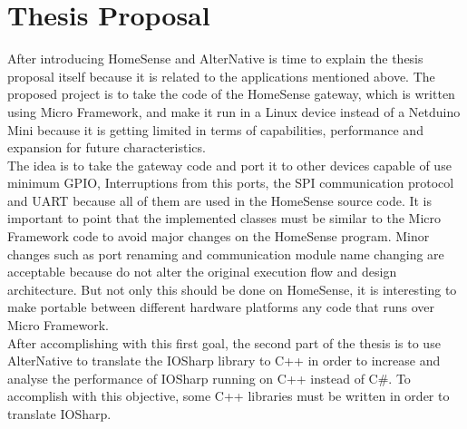 \section{Thesis Proposal}\label{S:Proposal-Thesis-Proposal}
After introducing HomeSense and AlterNative is time to explain the thesis proposal itself because it is related to the applications mentioned above. The proposed project is to take the code of the HomeSense gateway, which is written using Micro Framework, and make it run in a Linux device instead of a Netduino Mini because it is getting limited in terms of capabilities, performance and expansion for future characteristics.
\\
The idea is to take the gateway code and port it to other devices capable of use minimum GPIO, Interruptions from this ports, the SPI communication protocol and UART because all of them are used in the HomeSense source code. It is important to point that the implemented classes must be similar to the Micro Framework code to avoid major changes on the HomeSense program. Minor changes such as port renaming and communication module name changing are acceptable because do not alter the original execution flow and design architecture. But not only this should be done on HomeSense, it is interesting to make portable between different hardware platforms any code that runs over Micro Framework.
\\
After accomplishing with this first goal, the second part of the thesis is to use AlterNative to translate the IOSharp library to C++ in order to increase and analyse the performance of IOSharp running on C++ instead of C\#. To accomplish with this objective, some C++ libraries must be written in order to translate IOSharp.